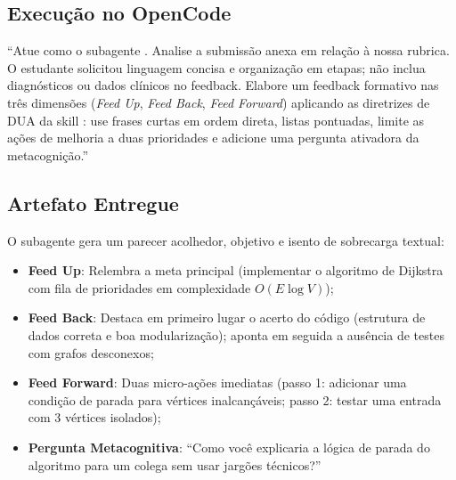 \subsection{Execu{\c c}{\~a}o no OpenCode}
\begin{tcolorbox}[colback=white, colframe=boxborder, arc=1mm, title={Comando Enviado pelo Professor}]
\small
``Atue como o subagente . Analise a submiss{\~a}o anexa em rela{\c c}{\~a}o {\`a} nossa rubrica. O estudante solicitou linguagem concisa e organiza{\c c}{\~a}o em etapas; n{\~a}o inclua diagn{\'o}sticos ou dados cl{\'i}nicos no feedback. Elabore um feedback formativo nas tr{\^e}s dimens{\~o}es (\emph{Feed Up}, \emph{Feed Back}, \emph{Feed Forward}) aplicando as diretrizes de DUA da skill : use frases curtas em ordem direta, listas pontuadas, limite as a{\c c}{\~o}es de melhoria a duas prioridades e adicione uma pergunta ativadora da metacogni{\c c}{\~a}o.''
\end{tcolorbox}

\subsection{Artefato Entregue}
O subagente gera um parecer acolhedor, objetivo e isento de sobrecarga textual:
\begin{itemize}
  \item \textbf{Feed Up}: Relembra a meta principal (implementar o algoritmo de Dijkstra com fila de prioridades em complexidade $O(E \log V)$);
  \item \textbf{Feed Back}: Destaca em primeiro lugar o acerto do c{\'o}digo (estrutura de dados correta e boa modulariza{\c c}{\~a}o); aponta em seguida a aus{\^e}ncia de testes com grafos desconexos;
  \item \textbf{Feed Forward}: Duas micro-a{\c c}{\~o}es imediatas (passo 1: adicionar uma condi{\c c}{\~a}o de parada para v{\'e}rtices inalcan{\c c}{\'a}veis; passo 2: testar uma entrada com 3 v{\'e}rtices isolados);
  \item \textbf{Pergunta Metacognitiva}: ``Como voc{\^e} explicaria a l{\'o}gica de parada do algoritmo para um colega sem usar jarg{\~o}es t{\'e}cnicos?''
\end{itemize}

